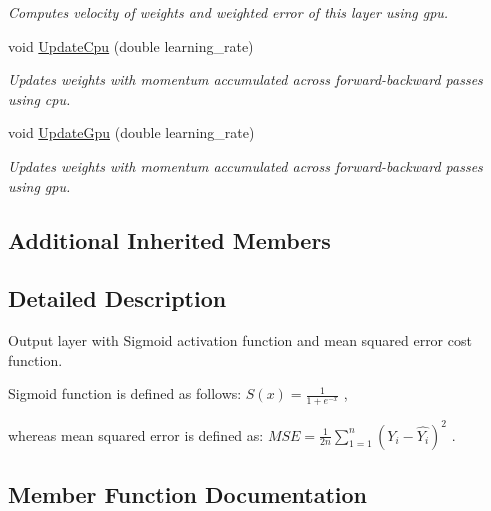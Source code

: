 \begin{DoxyCompactItemize}
\begin{DoxyCompactList}\small\item\em Computes velocity of weights and weighted error of this layer using gpu. \end{DoxyCompactList}\item 
void \hyperlink{classneuralnet_1_1SigmoidOutputLayer_acb41e05e0cbf78f2498b39ea4e4bedb0}{Update\+Cpu} (double learning\+\_\+rate)
\begin{DoxyCompactList}\small\item\em Updates weights with momentum accumulated across forward-\/backward passes using cpu. \end{DoxyCompactList}\item 
void \hyperlink{classneuralnet_1_1SigmoidOutputLayer_ae5760686dccc5dc3ebd99e5bf7e7a0b0}{Update\+Gpu} (double learning\+\_\+rate)
\begin{DoxyCompactList}\small\item\em Updates weights with momentum accumulated across forward-\/backward passes using gpu. \end{DoxyCompactList}\end{DoxyCompactItemize}
\subsection*{Additional Inherited Members}


\subsection{Detailed Description}
Output layer with Sigmoid activation function and mean squared error cost function. 

Sigmoid function is defined as follows\+: $S(x) = \frac{1}{{1 + e^{-x}}}$ ,

whereas mean squared error is defined as\+: $MSE = \frac{1}{2n}\sum_{1=1}^{n} (Y_{i} - \hat{Y_{i}})^2$ . 

\subsection{Member Function Documentation}
\mbox{\label{classneuralnet_1_1SigmoidOutputLayer_a8020ad060ff1c3349bbf67ec3f3fccb8}} 
